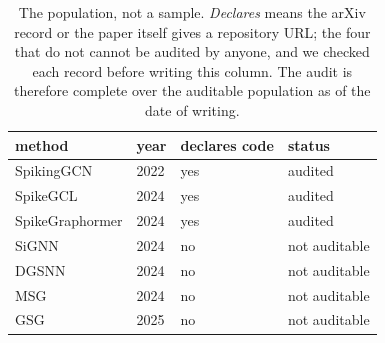 \begin{table}[t]
\centering
\footnotesize
\caption{The population, not a sample. \emph{Declares} means the arXiv record or the paper itself gives a repository URL; the four that do not cannot be audited by anyone, and we checked each record before writing this column. The audit is therefore complete over the auditable population as of the date of writing.}\label{tab:census}
\begin{tabular}{llll}
\toprule
method & year & declares code & status \\
\midrule
SpikingGCN \citep{zhu2022spiking} & 2022 & yes & audited \\
SpikeGCL \citep{li2023bit1} & 2024 & yes & audited \\
SpikeGraphormer \citep{sun2024spikegraphormer} & 2024 & yes & audited \\
SiGNN \citep{chen2024signn} & 2024 & no & not auditable \\
DGSNN \citep{yin2024dgsnn} & 2024 & no & not auditable \\
MSG \citep{sun2024riemannian} & 2024 & no & not auditable \\
GSG \citep{zhang2025geometry} & 2025 & no & not auditable \\
\bottomrule
\end{tabular}
\end{table}
